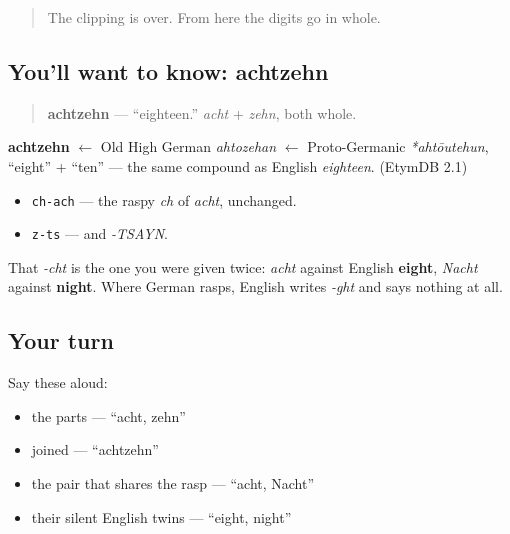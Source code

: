 \label{lesson:GE-C12-achtzehn}



\begin{quote}
The clipping is over. From here the digits go in whole.
\end{quote}

\subsection*{You'll want to know: achtzehn}
\begin{quote}
\textbf{achtzehn} — \textquotedblleft{}eighteen.\textquotedblright{} \emph{acht} + \emph{zehn}, both whole.
\end{quote}

\begin{cousinweb}
\textbf{achtzehn} $\leftarrow$ Old High German \emph{ahtozehan} $\leftarrow$ Proto-Germanic \emph{*ahtōutehun}, \textquotedblleft{}eight\textquotedblright{} + \textquotedblleft{}ten\textquotedblright{} — the same compound as English \emph{eighteen}. (EtymDB 2.1)
\end{cousinweb}

\begin{sounds}
\begin{itemize}
\raggedright
  \item \texttt{ch-ach} — the raspy \emph{ch} of \emph{acht}, unchanged.
  \item \texttt{z-ts} — and \emph{-TSAYN}.
\end{itemize}

That \emph{-cht} is the one you were given twice: \emph{acht} against English \textbf{eight}, \emph{Nacht} against \textbf{night}. Where German rasps, English writes \emph{-ght} and says nothing at all.
\end{sounds}

\subsection*{Your turn}
Say these aloud:

\begin{itemize}
\raggedright
  \item the parts — \textquotedblleft{}acht, zehn\textquotedblright{}
  \item joined — \textquotedblleft{}achtzehn\textquotedblright{}
  \item the pair that shares the rasp — \textquotedblleft{}acht, Nacht\textquotedblright{}
  \item their silent English twins — \textquotedblleft{}eight, night\textquotedblright{}
\end{itemize}

